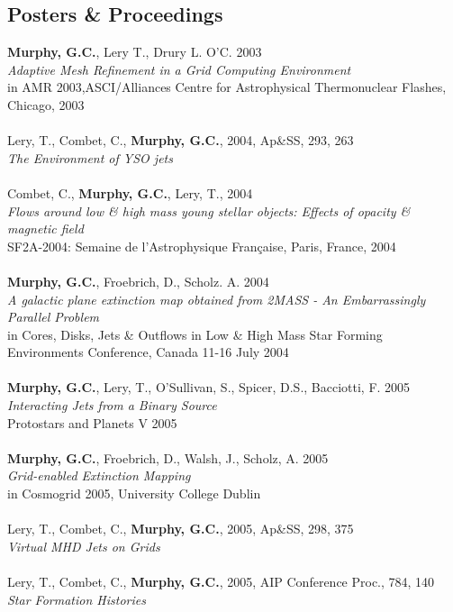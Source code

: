 \subsection*{Posters \& Proceedings}
{\bf Murphy, G.C.}, Lery T., Drury L. O'C. 2003
\\
\emph{Adaptive Mesh Refinement in a Grid Computing Environment}
\\
in AMR 2003,ASCI/Alliances Centre for Astrophysical Thermonuclear Flashes,
Chicago, 2003
\\
\\Lery, T., Combet, C., {\bf Murphy, G.C.},  2004, Ap\&SS, 293, 263
\\
\emph{ The Environment of YSO jets }
\\
\\Combet, C., {\bf Murphy, G.C.}, Lery, T., 2004
\\
\emph{Flows around low \& high mass young stellar objects: Effects of
opacity \& magnetic field}
\\
SF2A-2004: Semaine de l'Astrophysique Fran{\c{c}}aise, Paris, France, 2004
\\
\\{\bf Murphy, G.C.}, Froebrich, D., Scholz. A. 2004
\\
\emph{A galactic plane extinction map obtained from 2MASS - An
Embarrassingly Parallel Problem }
\\
in Cores, Disks, Jets \& Outflows in Low \& High Mass Star Forming
Environments Conference, Canada 11-16 July 2004
\\
\\{\bf Murphy, G.C.}, Lery, T., O'Sullivan, S., Spicer, D.S., Bacciotti, F. 2005
\\
\emph{Interacting Jets from a Binary Source}
\\
Protostars and Planets V 2005
\\
\\{\bf Murphy, G.C.}, Froebrich, D., Walsh, J., Scholz, A. 2005
\\
\emph{Grid-enabled Extinction Mapping}
\\
in Cosmogrid 2005, University College Dublin
\\
\\Lery, T., Combet, C., {\bf Murphy, G.C.}, 2005, Ap\&SS, 298, 375
\\
\emph{ Virtual MHD Jets on Grids }
\\
\\Lery, T., Combet, C., {\bf Murphy, G.C.}, 2005, AIP Conference Proc., 784, 140
\\
\emph{ Star Formation Histories}
